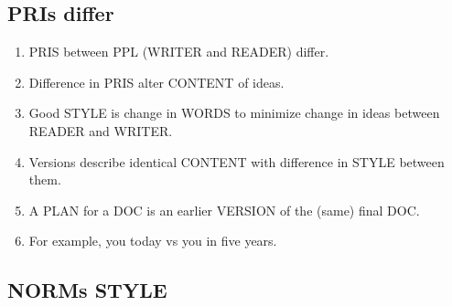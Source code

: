 \documentclass[
]{book}
\providecommand{\tightlist}{%
  \setlength{\itemsep}{0pt}\setlength{\parskip}{0pt}}
\begin{document}
\hypertarget{pris-differ}{%
\subsection{PRIs differ}\label{pris-differ}}

\begin{enumerate}
\def\labelenumi{\arabic{enumi}.}
\setcounter{enumi}{57}
\tightlist
\item
  PRIS between PPL (WRITER and READER) differ.
\item
  Difference in PRIS alter CONTENT of ideas.
\item
  Good STYLE is change in WORDS to minimize change in ideas between
  READER and WRITER.
\item
  Versions describe identical CONTENT with difference in STYLE between them.
\item
  A PLAN for a DOC is an earlier VERSION of the (same) final DOC.
\item
  For example, you today vs you in five years.
\end{enumerate}

\hypertarget{norms-style}{%
\subsection{NORMs STYLE}\label{norms-style}}
\end{document}
